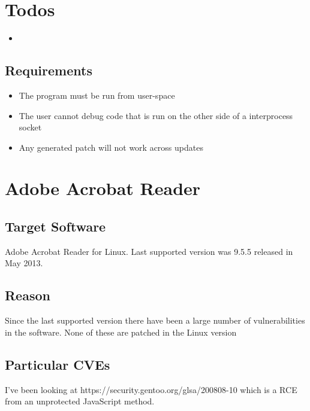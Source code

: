 \maketitle

\section{Todos}
\begin{itemize}
  \item 
{}
\end{itemize}

\subsection{Requirements}
\begin{itemize}
  \item The program must be run from user-space
  \item The user cannot debug code that is run on the other side of a interprocess socket
  \item Any generated patch will not work across updates
\end{itemize}

\section{Adobe Acrobat Reader}
\subsection{Target Software}
Adobe Acrobat Reader for Linux. Last supported version was 9.5.5 released in May 2013. 
\subsection{Reason}
Since the last supported version there have been a large number of vulnerabilities in the software. None of these are patched in the Linux version
\subsection{Particular CVEs}
I've been looking at https://security.gentoo.org/glsa/200808-10 which is a RCE from an unprotected JavaScript method.

